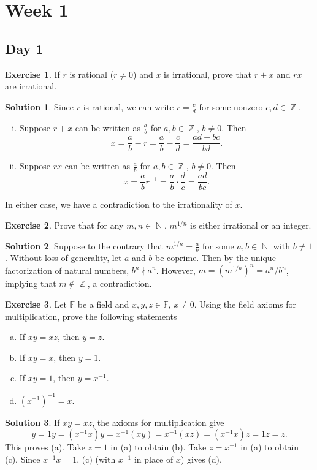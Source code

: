 \documentclass{article}
\theoremstyle{definition}
\newtheorem{exercise}{Exercise}
\newtheorem*{solution}{Solution}
\DeclareMathOperator{\N}{\mathbb{N}}
\DeclareMathOperator{\Z}{\mathbb{Z}}
\begin{document}
\section*{Week 1}
\subsection*{Day 1}

\begin{exercise}
    If \(r\) is rational (\(r\neq0\)) and \(x\) is irrational, prove that \(r+x\) and \(rx\) are irrational.
\end{exercise}
\begin{solution}
    Since \(r\) is rational, we can write \(r=\frac{c}{d}\) for some nonzero \(c,d\in\Z\).
    \begin{enumerate}[(i)]
        \item Suppose \(r+x\) can be written as \(\frac{a}{b}\) for \(a,b\in\Z\), \(b\neq0\). Then 
        \[x=\frac{a}{b}-r=\frac{a}{b}-\frac{c}{d}=\frac{ad-bc}{bd}.\]
        \item Suppose \(rx\) can be written as \(\frac{a}{b}\) for \(a,b\in\Z\), \(b\neq0\). Then
        \[x=\frac{a}{b}r^{-1}=\frac{a}{b}\cdot\frac{d}{c}=\frac{ad}{bc}.\]
    \end{enumerate}
    In either case, we have a contradiction to the irrationality of \(x\).
\end{solution}

\begin{exercise}
    Prove that for any \(m,n\in\N\), \(m^{1/n}\) is either irrational or an integer.
\end{exercise}
\begin{solution}
    Suppose to the contrary that \(m^{1/n}=\frac{a}{b}\) for some \(a,b\in\N\) with \(b\neq1\). Without loss of generality, let \(a\) and \(b\) be coprime. Then by the unique factorization of natural numbers, \(b^n\nmid a^n\). However, \(m=(m^{1/n})^n=a^n/b^n\), implying that \(m\not\in\Z\), a contradiction.
\end{solution}

\begin{exercise}
    Let \(\mathbb{F}\) be a field and \(x,y,z\in\mathbb{F}\), \(x\neq0\). Using the field axioms for multiplication, prove the following statements
    \begin{enumerate}[(a)]
        \item If \(xy=xz\), then \(y=z\).
        \item If \(xy=x\), then \(y=1\).
        \item If \(xy=1\), then \(y=x^{-1}\).
        \item \((x^{-1})^{-1}=x\).
    \end{enumerate}
\end{exercise}
\begin{solution}
    If \(xy=xz\), the axioms for multiplication give
    \[y=1y=(x^{-1}x)y=x^{-1}(xy)=x^{-1}(xz)=(x^{-1}x)z=1z=z.\]
    This proves (a). Take \(z=1\) in (a) to obtain (b). Take \(z=x^{-1}\) in (a) to obtain (c). Since \(x^{-1}x=1\), (c) (with \(x^{-1}\) in place of \(x\)) gives (d).
\end{solution}
\end{document}
